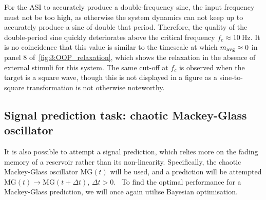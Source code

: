 
For the ASI to accurately produce a double-frequency sine, the input frequency must not be too high, as otherwise the system dynamics can not keep up to accurately produce a sine of double that period.
Therefore, the quality of the double-period sine quickly deteriorates above the critical frequency $f_c \approx \SI{10}{\hertz}$.
It is no coincidence that this value is similar to the timescale at which $m_\mathrm{avg} \approx 0$ in panel 8 of~\cref{fig:3:OOP_relaxation}, which shows the relaxation in the absence of external stimuli for this system.
The same cut-off at $f_c$ is observed when the target is a square wave, though this is not displayed in a figure as a sine-to-square transformation is not otherwise noteworthy.

\subsection{Signal prediction task: chaotic Mackey-Glass oscillator}
It is also possible to attempt a signal prediction, which relies more on the fading memory of a reservoir rather than its non-linearity.
Specifically, the chaotic Mackey-Glass oscillator $\mathrm{MG}(t)$ will be used, and a prediction will be attempted
$\mathrm{MG}(t) \rightarrow \mathrm{MG}(t+\Delta t)$, $\Delta t > 0$.~\cite{MackeyGlass}
To find the optimal performance for a Mackey-Glass prediction, we will once again utilise Bayesian optimisation.


